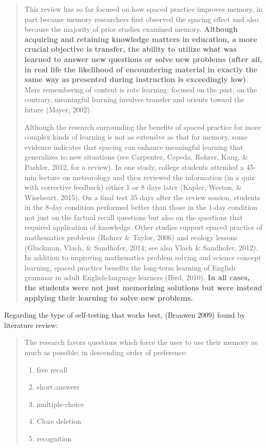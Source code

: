 \begin{quote}
This review has so far focused on how spaced practice improves memory,
in part because memory researchers first observed the spacing effect and
also because the majority of prior studies examined memory.
\textbf{Although acquiring and retaining knowledge matters in education,
a more crucial objective is transfer, the ability to utilize what was
learned to answer new questions or solve new problems (after all, in
real life the likelihood of encountering material in exactly the same
way as presented during instruction is exceedingly low)}. Mere
remembering of content is rote learning, focused on the past; on the
contrary, meaningful learning involves transfer and orients toward the
future (Mayer, 2002).

Although the research surrounding the benefits of spaced practice for
more complex kinds of learning is not as extensive as that for memory,
some evidence indicates that spacing can enhance meaningful learning
that generalizes to new situations (see Carpenter, Cepeda, Rohrer, Kang,
\& Pashler, 2012, for a review). In one study, college students attended
a 45-min lecture on meteorology and then reviewed the information (in a
quiz with corrective feedback) either 1 or 8 days later (Kapler, Weston,
\& Wiseheart, 2015). On a final test 35 days after the review session,
students in the 8-day condition performed better than those in the 1-day
condition not just on the factual recall questions but also on the
questions that required application of knowledge. Other studies support
spaced practice of mathematics problems (Rohrer \& Taylor, 2006) and
ecology lessons (Gluckman, Vlach, \& Sandhofer, 2014; see also Vlach \&
Sandhofer, 2012). In addition to improving mathematics problem solving
and science concept learning, spaced practice benefits the long-term
learning of English grammar in adult English-language learners (Bird,
2010). \textbf{In all cases, the students were not just memorizing
solutions but were instead applying their learning to solve new
problems.}
\end{quote}

Regarding the type of self-testing that works best, (Branwen 2009) found
by literature review:

\begin{quote}
The research favors questions which force the user to use their memory
as much as possible; in descending order of preference:

\begin{enumerate}
\def\labelenumi{\arabic{enumi}.}
\tightlist
\item
  free recall
\item
  short answers
\item
  multiple-choice
\item
  Cloze deletion
\item
  recognition
\end{enumerate}
\end{quote}

